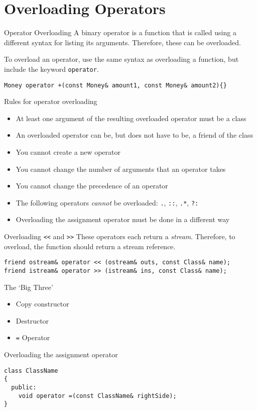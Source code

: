 \documentclass[\main/notes.tex]{subfiles}
\begin{document}
		\section{Overloading Operators}
			\begin{sidenote}{Operator Overloading}
				A binary operator is a function that is called using a different syntax for listing its arguments. Therefore, these can be overloaded.

				To overload an operator, use the same syntax as overloading a function, but include the keyword \texttt{operator}.
				\begin{verbatim}
Money operator +(const Money& amount1, const Money& amount2){}
				\end{verbatim}
			\end{sidenote}
			\begin{definition}{Rules for operator overloading}
				\begin{itemize}[nosep]
					\item At least one argument of the resulting overloaded operator must be a class
					\item An overloaded operator can be, but does not have to be, a friend of the class
					\item You cannot create a new operator
					\item You cannot change the number of arguments that an operator takes
					\item You cannot change the precedence of an operator
					\item The following operators \emph{cannot} be overloaded: \texttt{.}, \texttt{::}, \texttt{.*}, \texttt{?:}
					\item Overloading the assignment operator must be done in a different way
				\end{itemize}
			\end{definition}
			\begin{sidenote}{Overloading \texttt{<<} and \texttt{>>}}
				These operators each return a \emph{stream}. Therefore, to overload, the function should return a stream reference.
				\begin{verbatim}
friend ostream& operator << (ostream& outs, const Class& name);
friend istream& operator >> (istream& ins, const Class& name);
				\end{verbatim}
			\end{sidenote}
			\begin{sidenote}{The `Big Three'}
				\begin{itemize}[nosep]
					\item Copy constructor
					\item Destructor
					\item \texttt{=} Operator
				\end{itemize}
			\end{sidenote}
			\begin{codebox}{Overloading the assignment operator}
				\begin{verbatim}
class ClassName
{
  public:
    void operator =(const ClassName& rightSide);
}
				\end{verbatim}
			\end{codebox}
\end{document}
